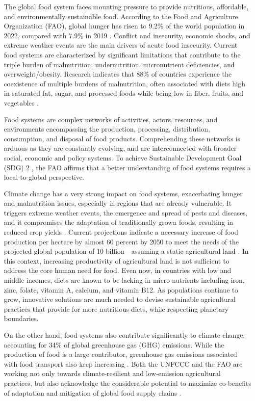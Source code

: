 \documentclass{oqireport}
\begin{document}
The global food system faces mounting pressure to provide nutritious, affordable, and environmentally sustainable food. According to the Food and Agriculture Organization (FAO), global hunger has risen to 9.2\% of the world population in 2022, compared with 7.9\% in 2019 \cite{FAO_hunger}. Conflict and insecurity, economic shocks, and extreme weather events are the main drivers of acute food insecurity. Current food systems are characterized by significant limitations that contribute to the triple burden of malnutrition: undernutrition, micronutrient deficiencies, and overweight/obesity. Research indicates that 88\% of countries experience the coexistence of multiple burdens of malnutrition, often associated with diets high in saturated fat, sugar, and processed foods while being low in fiber, fruits, and vegetables \cite{ZOU2022100624}.

Food systems are complex networks of activities, actors, resources, and environments encompassing the production, processing, distribution, consumption, and disposal of food products. Comprehending these networks is arduous as they are constantly evolving, and are interconnected with broader social, economic and policy systems. To achieve Sustainable Development Goal (SDG) 2 \cite{UN_SDG2}, the FAO affirms that a better understanding of food systems requires a local-to-global perspective.

Climate change has a very strong impact on food systems, exacerbating hunger and malnutrition issues, especially in regions that are already vulnerable. It triggers extreme weather events, the emergence and spread of pests and diseases, and it compromises the adaptation of traditionally grown foods, resulting in reduced crop yields \cite{IPCC_food_security}. Current projections indicate a necessary increase of food production per hectare by almost 60 percent by 2050 to meet the needs of the projected global population of 10 billion—assuming a static agricultural land \cite{GESDA_radar}. In this context, increasing productivity of agricultural land is not sufficient to address the core human need for food. Even now, in countries with low and middle incomes, diets are known to be lacking in micro-nutrients including iron, zinc, folate, vitamin A, calcium, and vitamin B12. As populations continue to grow, innovative solutions are much needed to devise sustainable agricultural practices that provide for more nutritious diets, while respecting planetary boundaries.

On the other hand, food systems also contribute significantly to climate change, accounting for 34\% of global greenhouse gas (GHG) emissions. While the production of food is a large contributor, greenhouse gas emissions associated with food transport also keep increasing \cite{Pradhan2022}. Both the UNFCCC and the FAO are working not only towards climate-resilient and low-emission agricultural practices, but also acknowledge the considerable potential to maximize co-benefits of adaptation and mitigation of global food supply chains \cite{FAO_climate_strategy}.
\end{document}
